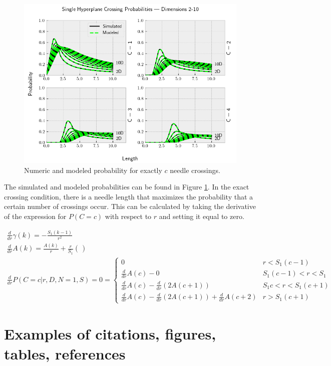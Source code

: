 \documentclass{article}
\begin{document}
\begin{figure}
	\centerline{\includegraphics[width=5in]{numeric_sim_N1_e.png}}
	\caption{Numeric and modeled probability for exactly $c$ needle crossings.}
	\label{fig:numeric sim N1 e}
\end{figure}

The simulated and modeled probabilities can be found in Figure \ref{fig:numeric sim N1 e}. In the exact
crossing condition, there is a needle length that maximizes the probability that a certain number of crossings
occur. This can be calculated by taking the derivative of the expression for $P(C=c)$ with respect to $r$
and setting it equal to zero.

\begin{gather}
	\frac{d}{dr}\gamma(k) = -\frac{S_1(k-1)}{r^2} \\
	\frac{d}{dr}A(k) = \frac{A(k)}{r}+\frac{r}{S_1}\left( \frac{}{} \right) \\
	\frac{d}{dr}P(C=c|r,D,N=1,S) = 0 = \begin{cases}
		0 & r<S_1(c-1) \\
		\frac{d}{dr}A(c) - 0 & S_1(c-1) < r < S_1 \\
		\frac{d}{dr}A(c) - \frac{d}{dr}(2A(c+1)) & S_1c<r<S_1(c+1) \\
		\frac{d}{dr}A(c) - \frac{d}{dr}(2A(c+1)) + \frac{d}{dr}A(c+2) & r>S_1(c+1)
	\end{cases}
\end{gather}

\section{Examples of citations, figures, tables, references}
\label{sec:others}
\end{document}
